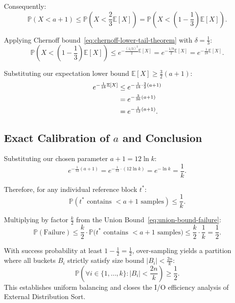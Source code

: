 Consequently:
\begin{equation}
  \mathbb{P}(X < a + 1) \le \mathbb{P}\left(X < \frac{2}{3}\mathbb{E}[X]\right) = \mathbb{P}\left(X < \left(1 - \frac{1}{3}\right)\mathbb{E}[X]\right).
\end{equation}

Applying Chernoff bound~\eqref{eq:chernoff-lower-tail-theorem} with $\delta = \frac{1}{3}$:
\begin{equation}
  \mathbb{P}\left(X < \left(1 - \frac{1}{3}\right)\mathbb{E}[X]\right) \le e^{-\frac{(1/3)^2}{2}\mathbb{E}[X]} = e^{-\frac{1/9}{2}\mathbb{E}[X]} = e^{-\frac{1}{18}\mathbb{E}[X]}.
\end{equation}

Substituting our expectation lower bound $\mathbb{E}[X] \ge \frac{3}{2}(a + 1)$:
\begin{align}
  e^{-\frac{1}{18}\mathbb{E}[X]} &\le e^{-\frac{1}{18} \cdot \frac{3}{2}(a + 1)} \notag\\
  &= e^{-\frac{3}{36}(a + 1)} \notag\\
  &= e^{-\frac{1}{12}(a + 1)}.
\end{align}

\subsection{Exact Calibration of \texorpdfstring{$a$}{a} and Conclusion}
Substituting our chosen parameter $a + 1 = 12 \ln k$:
\begin{equation}
  e^{-\frac{1}{12}(a + 1)} = e^{-\frac{1}{12} \cdot (12 \ln k)} = e^{-\ln k} = \frac{1}{k}.
\end{equation}

Therefore, for any individual reference block $t^*$:
\begin{equation}
  \mathbb{P}(t^* \text{ contains } < a + 1 \text{ samples}) \le \frac{1}{k}.
\end{equation}

Multiplying by factor $\frac{k}{2}$ from the Union Bound~\eqref{eq:union-bound-failure}:
\begin{equation}
  \mathbb{P}(\text{Failure}) \le \frac{k}{2} \cdot \mathbb{P}\big(t^* \text{ contains } < a + 1 \text{ samples}\big) \le \frac{k}{2} \cdot \frac{1}{k} = \frac{1}{2}.
\end{equation}

\begin{theorem}
With success probability at least $1 - \frac{1}{2} = \frac{1}{2}$, over-sampling yields a partition where all buckets $B_i$ strictly satisfy size bound $|B_i| < \frac{2n}{k}$:
\begin{equation}
  \mathbb{P}\left(\forall i \in \{1, \dots, k\} \colon |B_i| < \frac{2n}{k}\right) \ge \frac{1}{2}.
\end{equation}
This establishes uniform balancing and closes the I/O efficiency analysis of External Distribution Sort. \qedhere
\end{theorem}

